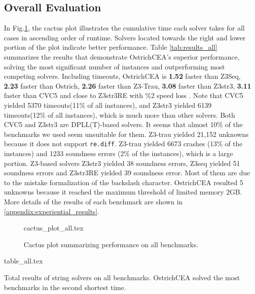 \subsection{Overall Evaluation}
In Fig.\ref{fig:cactus_all}, the cactus plot illustrates the cumulative time each solver takes for all cases in ascending order of runtime. Solvers located towards the right and lower portion of the plot indicate better performance. \newline
Table \ref{tab:results_all} summarizes the results that demonstrate OstrichCEA's superior performance, solving the most significant number of instances and outperforming most competing solvers. Including timeouts, OstrichCEA is \textbf{1.52}\mult{} faster than Z3Seq, \textbf{2.23}\mult{} faster than Ostrich, \textbf{2.26}\mult{} faster than Z3-Trau, \textbf{3.08}\mult{} faster than Z3str3, \textbf{3.11}\mult{} faster than CVC5 and close to Z3str3RE with \%2 speed loss . Note that CVC5\cite{cvc5} yielded 5370 timeouts(11\% of all instances), and Z3str3\cite{z3str3} yielded 6139 timeouts(12\% of all instances), which is much more than other solvers. Both CVC5 and Z3str3 are DPLL(T)-based solvers. It seems that almost 10\% of the benchmarks we used seem unsuitable for them. Z3-trau\cite{z3trau} yielded 21,152 unknowns because it does not support \verb|re.diff|. Z3-trau\cite{z3trau} yielded 6673 crashes (13\% of the instances) and 1233 soundness errors (2\% of the instances), which is a large portion. Z3-based solvers Z3str3 yielded 38 soundness errors, Z3seq\cite{z3seq} yielded 51 soundness errors and Z3str3RE\cite{z3str3re} yielded 39 soundness error. Most of them are due to the mistake formalization of the backslash character. OstrichCEA resulted 5 unknowns because it reached the maximum threshold of limited memory 2GB. More details of the results of each benchmark are shown in \ref{appendix:experiential_results}.
\begin{figure}[h]
  \centering
  {cactus_plot_all.tex}
  \caption{Cactus plot summarizing performance on all benchmarks.}
  \label{fig:cactus_all}
\end{figure}
\begin{table}
  {table_all.tex}
  \caption{Total results of string solvers on all benchmarks. OstrichCEA solved the most benchmarks in the second shortest time.}
  \label{tab:results_all}
\end{table}

